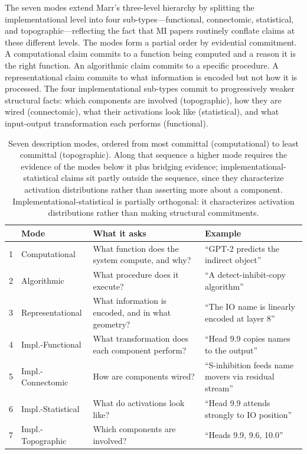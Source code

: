 \documentclass{article}
\begin{document}
The seven modes extend Marr's three-level hierarchy \citep{marr1982vision} by splitting the implementational level into four sub-types---functional, connectomic, statistical, and topographic---reflecting the fact that MI papers routinely conflate claims at these different levels. The modes form a partial order by evidential commitment. A computational claim commits to a function being computed and a reason it is the right function. An algorithmic claim commits to a specific procedure. A representational claim commits to what information is encoded but not how it is processed. The four implementational sub-types commit to progressively weaker structural facts: which components are involved (topographic), how they are wired (connectomic), what their activations look like (statistical), and what input-output transformation each performs (functional).

\begin{table}[H]
\centering
\small
\caption{Seven description modes, ordered from most committal (computational) to least committal (topographic). Along that sequence a higher mode requires the evidence of the modes below it plus bridging evidence; implementational-statistical claims sit partly outside the sequence, since they characterize activation distributions rather than asserting more about a component. Implementational-statistical is partially orthogonal: it characterizes activation distributions rather than making structural commitments.}
\label{tab:modes}
\renewcommand{\arraystretch}{1.2}
\begin{tabular}{@{}rl>{\raggedright\arraybackslash}p{4.8cm}>{\raggedright\arraybackslash}p{5.2cm}@{}}
\toprule
& \textbf{Mode} & \textbf{What it asks} & \textbf{Example} \\
\midrule
1 & Computational & What function does the system compute, and why? & ``GPT-2 predicts the indirect object'' \\
\midrule
2 & Algorithmic & What procedure does it execute? & ``A detect-inhibit-copy algorithm'' \\
\midrule
3 & Representational & What information is encoded, and in what geometry? & ``The IO name is linearly encoded at layer 8'' \\
\midrule
4 & Impl.-Functional & What transformation does each component perform? & ``Head 9.9 copies names to the output'' \\
\midrule
5 & Impl.-Connectomic & How are components wired? & ``S-inhibition feeds name movers via residual stream'' \\
\midrule
6 & Impl.-Statistical & What do activations look like? & ``Head 9.9 attends strongly to IO position'' \\
\midrule
7 & Impl.-Topographic & Which components are involved? & ``Heads 9.9, 9.6, 10.0'' \\
\bottomrule
\end{tabular}
\end{table}
\end{document}
